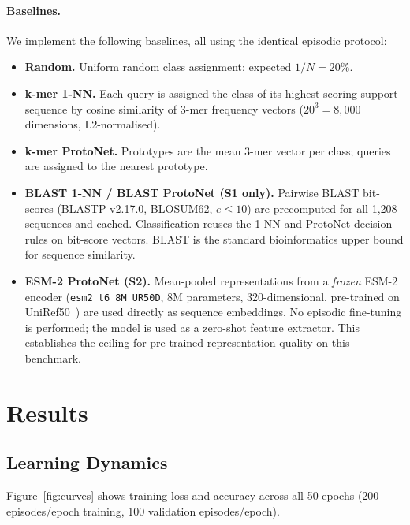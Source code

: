 \documentclass[11pt,a4paper]{article}
\begin{document}
\paragraph{Baselines.}
We implement the following baselines, all using the identical episodic protocol:

\begin{itemize}[noitemsep]
  \item \textbf{Random.} Uniform random class assignment: expected $1/N = 20\%$.
  \item \textbf{k-mer 1-NN.} Each query is assigned the class of its
        highest-scoring support sequence by cosine similarity of 3-mer frequency
        vectors ($20^3 = 8{,}000$ dimensions, L2-normalised).
  \item \textbf{k-mer ProtoNet.} Prototypes are the mean 3-mer vector per class;
        queries are assigned to the nearest prototype.
  \item \textbf{BLAST 1-NN / BLAST ProtoNet (S1 only).} Pairwise BLAST bit-scores
        (BLASTP v2.17.0, BLOSUM62, $e \leq 10$) are precomputed for all 1{,}208
        sequences and cached.  Classification reuses the 1-NN and ProtoNet
        decision rules on bit-score vectors.  BLAST is the standard bioinformatics
        upper bound for sequence similarity.
  \item \textbf{ESM-2 ProtoNet (S2).} Mean-pooled representations from a
        \emph{frozen} ESM-2 encoder ({\tt esm2\_t6\_8M\_UR50D}, 8M parameters,
        320-dimensional, pre-trained on UniRef50~\cite{lin2023evolutionary}) are
        used directly as sequence embeddings.  No episodic fine-tuning is
        performed; the model is used as a zero-shot feature extractor.  This
        establishes the ceiling for pre-trained representation quality on this
        benchmark.
\end{itemize}

\section{Results}
\label{sec:results}

\subsection{Learning Dynamics}

Figure~\ref{fig:curves} shows training loss and accuracy across all 50 epochs
(200 episodes/epoch training, 100 validation episodes/epoch).
\end{document}
